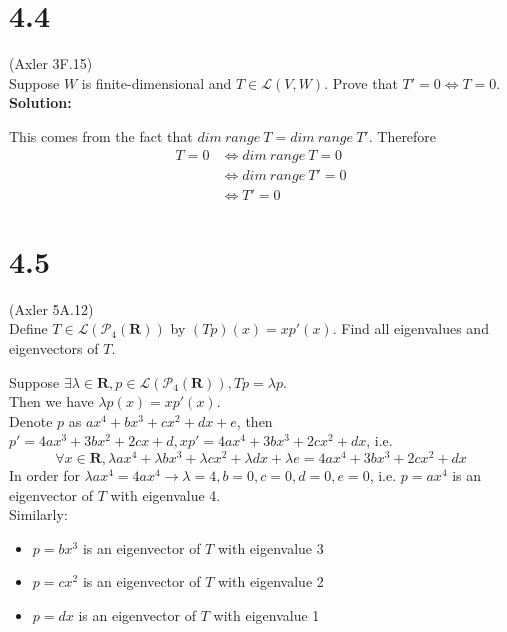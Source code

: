 \documentclass{article}
\begin{document}
\section*{4.4}
(Axler 3F.15)\\
Suppose $W$ is finite-dimensional and $T \in \mathcal{L}(V, W)$. Prove that $T' = 0 \iff T = 0$.\\
\textbf{Solution:}
\begin{addmargin}[1em]{0em}
    This comes from the fact that $dim\ range\ T = dim\ range\ T'$. Therefore
    \begin{equation*}
        \begin{split}
            T = 0 & \iff dim\ range\ T = 0\\
            & \iff dim\ range\ T' = 0\\
            & \iff T' = 0
        \end{split}
    \end{equation*}
\end{addmargin}
\section*{4.5}
(Axler 5A.12)\\
Define $T \in \mathcal{L}(\mathcal{P}_4(\mathbf{R}))$ by $(Tp)(x) = xp'(x)$. Find all eigenvalues and eigenvectors of $T$.
\begin{addmargin}[1em]{0em}
    Suppose $\exists \lambda \in \mathbf{R}, p \in \mathcal{L}(\mathcal{P}_4(\mathbf{R})), Tp = \lambda p$.\\
    Then we have $\lambda p(x) = xp'(x)$.\\
    Denote $p$ as $ax^4 + bx^3 + cx^2 + dx + e$, then $p' = 4ax^3 + 3bx^2 + 2cx + d, xp' = 4ax^4 + 3bx^3 + 2cx^2 + dx$, i.e.
    \begin{equation*}
        \forall x \in \mathbf{R}, \lambda ax^4 + \lambda bx^3 + \lambda cx^2 + \lambda dx + \lambda e = 4ax^4 + 3bx^3 + 2cx^2 + dx
    \end{equation*}
    In order for $\lambda ax^4 = 4ax^4 \rightarrow \lambda = 4, b = 0, c = 0, d = 0, e = 0$, i.e. $p = ax^4$ is an eigenvector of $T$ with eigenvalue 4.\\
    Similarly:
    \begin{itemize}
        \item $p = bx^3$ is an eigenvector of $T$ with eigenvalue 3
        \item $p = cx^2$ is an eigenvector of $T$ with eigenvalue 2
        \item $p = dx$ is an eigenvector of $T$ with eigenvalue 1
    \end{itemize} 
\end{addmargin}
\end{document}
